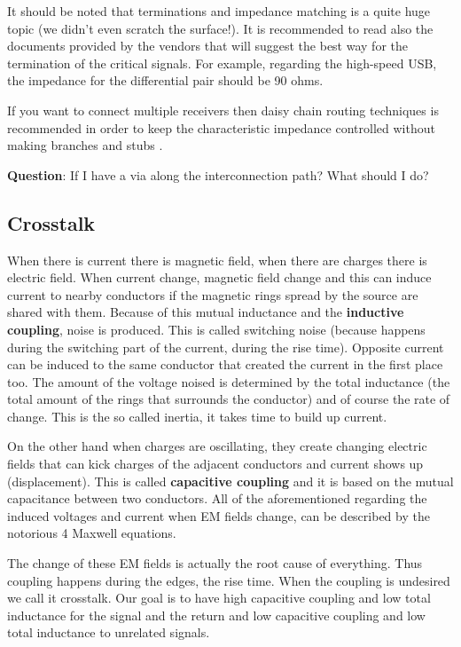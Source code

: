 \documentclass[final]{cubedoc}
\begin{document}
	It should be noted that terminations and impedance matching is a quite huge topic (we didn't even scratch the surface!). It is recommended to read also the documents provided by the vendors that will suggest the best way for the termination of the critical signals. For example, regarding the high-speed USB, the impedance for the differential pair should be 90 ohms.
	
	
	If you want to connect multiple receivers then daisy chain routing techniques is recommended in order to keep the characteristic impedance controlled without making branches and stubs \cite{bogatin2009signal}.
	
	\textbf{Question}: If I have a via along the interconnection path? What should I do?
	
	\subsection{Crosstalk}
	
	
	When there is current there is magnetic field, when there are charges there is electric field. When current change, magnetic field change and this can induce current to nearby conductors if the magnetic rings spread by the source are shared with them. Because of this mutual inductance and the \textbf{inductive coupling}, noise is produced. This is called switching noise (because happens during the switching part of the current, during the rise time). Opposite current can be induced to the same conductor that created the current in the first place too. The amount of the voltage noised is determined by the total inductance (the total amount of the rings that surrounds the conductor) and of course the rate of change. This is the so called inertia, it takes time to build up current. 
	
	On the other hand when charges are oscillating, they create changing electric fields that can kick charges of the adjacent conductors and current shows up (displacement). This is called \textbf{capacitive coupling} and it is based on the mutual capacitance between two conductors. All of the aforementioned regarding the induced voltages and current when EM fields change, can be described by the notorious 4 Maxwell equations.
	
	The change of these EM fields is actually the root cause of everything. Thus coupling happens during the edges, the rise time. When the coupling is undesired we call it crosstalk. Our goal is to have high capacitive coupling and low total inductance for the signal and the return and low capacitive coupling and low total inductance to unrelated signals.
	
\end{document}
